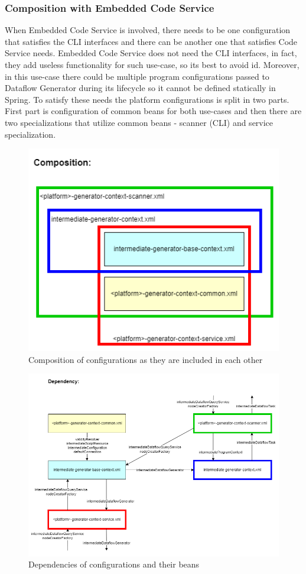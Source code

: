 \subsubsection{Composition with Embedded Code Service}
When Embedded Code Service is involved, there needs to be one configuration that satisfies the CLI interfaces and there can be another one that satisfies Code Service needs. Embedded Code Service does not need the CLI interfaces, in fact, they add useless functionality for such use-case, so its best to avoid id. Moreover, in this use-case there could be multiple program configurations passed to Dataflow Generator during its lifecycle so it cannot be defined statically in Spring. To satisfy these needs the platform configurations is split in two parts. First part is configuration of common beans for both use-cases and then there are two specializations that utilize common beans - scanner (CLI) and service specialization.
\begin{figure}[ht]\centering
\includegraphics[width=1.0\textwidth]{img/Intermediate Dataflow Generator Configuration-code service-aware composition.png}
\caption{Composition of configurations as they are included in each other}
\label{fig01:ECSbasedesign05}
\end{figure}  
\begin{figure}[ht]\centering
\includegraphics[width=1.0\textwidth]{img/Intermediate Dataflow Generator Configuration-code service-aware dependency.png}
\caption{Dependencies of configurations and their beans}
\label{fig01:ECSbasedesign06}
\end{figure} 




